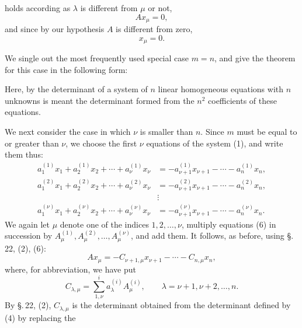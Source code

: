 
holds according as \(\lambda\) is different from \(\mu\) or not,
\[
 A x_\mu=0,
\]
and since by our hypothesis \(A\) is different from zero,
\[
 x_\mu=0.
\]

We single out the most frequently used special case \(m=n\), and give the theorem for this case in the following form:



Here, by the determinant of a system of \(n\) linear homogeneous equations with \(n\) unknowns is meant the determinant formed from the \(n^2\) coefficients of these equations.

We next consider the case in which \(\nu\) is smaller than \(n\). Since \(m\) must be equal to or greater than \(\nu\), we choose the first \(\nu\) equations of the system (1), and write them thus:
\begin{equation}
\begin{aligned}
 a_1^{(1)}x_1+a_2^{(1)}x_2+\cdots+a_\nu^{(1)}x_\nu&=-a_{\nu+1}^{(1)}x_{\nu+1}-\cdots-a_n^{(1)}x_n,\\
 a_1^{(2)}x_1+a_2^{(2)}x_2+\cdots+a_\nu^{(2)}x_\nu&=-a_{\nu+1}^{(2)}x_{\nu+1}-\cdots-a_n^{(2)}x_n,\\
 &\vdots\\
 a_1^{(\nu)}x_1+a_2^{(\nu)}x_2+\cdots+a_\nu^{(\nu)}x_\nu&=-a_{\nu+1}^{(\nu)}x_{\nu+1}-\cdots-a_n^{(\nu)}x_n.
\end{aligned}
\tag{6}
\end{equation}
We again let \(\mu\) denote one of the indices \(1,2,\ldots,\nu\), multiply equations (6) in succession by \(A_\mu^{(1)},A_\mu^{(2)},\ldots,A_\mu^{(\nu)}\), and add them. It follows, as before, using \S.\,22, (2), (6):
\begin{equation}
 A x_\mu=-C_{\nu+1,\mu}x_{\nu+1}-\cdots-C_{n,\mu}x_n,
\tag{7}
\end{equation}
where, for abbreviation, we have put
\begin{equation}
 C_{\lambda,\mu}=\sum_{1,\nu}^{i}a_\lambda^{(i)}A_\mu^{(i)},
 \qquad \lambda=\nu+1,\nu+2,\ldots,n.
\tag{8}
\end{equation}
By \S.\,22, (2), \(C_{\lambda,\mu}\) is the determinant obtained from the determinant defined by (4) by replacing the
